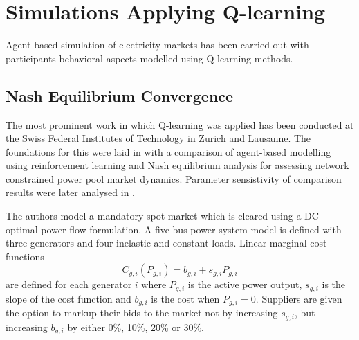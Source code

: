 \section{Simulations Applying Q-learning}
%
Agent-based simulation of electricity markets has been carried out with
participants behavioral aspects modelled using Q-learning methods.

\subsection{Nash Equilibrium Convergence}
The most prominent work in which Q-learning was applied has been conducted
at the Swiss Federal Institutes of Technology in Zurich and Lausanne. The
foundations for this were laid in \cite{krause:nash04} with a comparison of agent-based modelling using reinforcement learning and Nash equilibrium
analysis for assessing network constrained power pool market dynamics.
Parameter sensistivity of comparison results were later analysed in
\cite{krause:nash06}.

The authors model a mandatory spot market which is cleared using a DC
optimal power flow formulation.  A five bus power system model is defined with
three generators and four inelastic and constant loads.  Linear marginal cost
functions
\begin{equation}
C_{g,i}(P_{g,i}) = b_{g,i} + s_{g,i}P_{g,i}
\end{equation}
are defined for each generator $i$ where $P_{g,i}$ is the active power output,
$s_{g,i}$ is the slope of the cost function and $b_{g,i}$ is the cost when
$P_{g,i} = 0$.  Suppliers are given the option to markup their bids to the
market not by increasing $s_{g,i}$, but increasing $b_{g,i}$ by either 0\%,
10\%, 20\% or 30\%.

